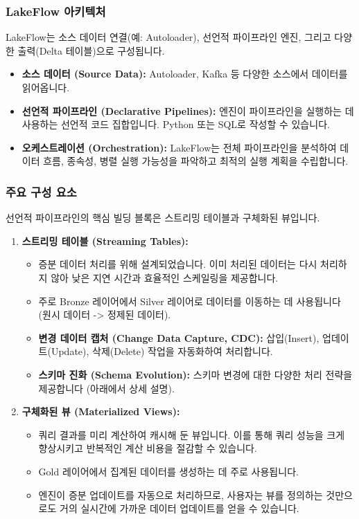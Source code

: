 \documentclass[11pt,a4paper]{article}
\begin{document}
\begin{enumerate}
\subsubsection{LakeFlow 아키텍처}
LakeFlow는 소스 데이터 연결(예: Autoloader), 선언적 파이프라인 엔진, 그리고 다양한 출력(Delta 테이블)으로 구성됩니다.

\begin{itemize}
    \item \textbf{소스 데이터 (Source Data):} Autoloader, Kafka 등 다양한 소스에서 데이터를 읽어옵니다.
    \item \textbf{선언적 파이프라인 (Declarative Pipelines):} 엔진이 파이프라인을 실행하는 데 사용하는 선언적 코드 집합입니다. Python 또는 SQL로 작성할 수 있습니다.
    \item \textbf{오케스트레이션 (Orchestration):} LakeFlow는 전체 파이프라인을 분석하여 데이터 흐름, 종속성, 병렬 실행 가능성을 파악하고 최적의 실행 계획을 수립합니다.
\end{itemize}

\subsubsection{주요 구성 요소}
선언적 파이프라인의 핵심 빌딩 블록은 스트리밍 테이블과 구체화된 뷰입니다.

\begin{enumerate}
    \item \textbf{스트리밍 테이블 (Streaming Tables):}
    \begin{itemize}
        \item 증분 데이터 처리를 위해 설계되었습니다. 이미 처리된 데이터는 다시 처리하지 않아 낮은 지연 시간과 효율적인 스케일링을 제공합니다.
        \item 주로 Bronze 레이어에서 Silver 레이어로 데이터를 이동하는 데 사용됩니다 (원시 데이터 -> 정제된 데이터).
        \item \textbf{변경 데이터 캡처 (Change Data Capture, CDC):} 삽입(Insert), 업데이트(Update), 삭제(Delete) 작업을 자동화하여 처리합니다.
        \item \textbf{스키마 진화 (Schema Evolution):} 스키마 변경에 대한 다양한 처리 전략을 제공합니다 (아래에서 상세 설명).
    \end{itemize}

    \item \textbf{구체화된 뷰 (Materialized Views):}
    \begin{itemize}
        \item 쿼리 결과를 미리 계산하여 캐시해 둔 뷰입니다. 이를 통해 쿼리 성능을 크게 향상시키고 반복적인 계산 비용을 절감할 수 있습니다.
        \item Gold 레이어에서 집계된 데이터를 생성하는 데 주로 사용됩니다.
        \item 엔진이 증분 업데이트를 자동으로 처리하므로, 사용자는 뷰를 정의하는 것만으로도 거의 실시간에 가까운 데이터 업데이트를 얻을 수 있습니다.
    \end{itemize}
\end{enumerate}


\end{enumerate}
\end{document}
